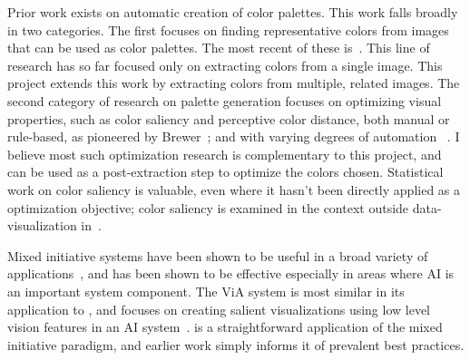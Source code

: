 Prior work exists on automatic creation of color palettes. This work falls broadly in two categories. The first focuses on finding representative  colors from images that can be used as color palettes. The most recent of these is~\cite{morse2007image}. This line of research has so far focused only on extracting colors from a single image. This project extends this work by extracting colors from multiple, related images. The second category of research on palette generation focuses on optimizing visual properties, such as color saliency and perceptive color distance, both manual or rule-based, as pioneered by Brewer~\cite{brewer1999color}; and  with varying degrees of automation ~\cite{healey1996choosing, zeileis2009RGBland}. I believe most such optimization research is complementary to this project, and can be used as a post-extraction step to optimize the colors chosen. Statistical work on color saliency is valuable, even where it hasn't been directly applied as a optimization objective; color saliency is examined in the context outside data-visualization in~\cite{chuang2008probabilistic, benavente2002statistical}. 

Mixed initiative systems have been shown to be useful in a broad variety of applications~\cite{hearst1999mixed}, and has been shown to be effective especially in areas where AI is an important system component. The ViA system is most similar in its application to \system, and focuses on creating salient visualizations using low level vision features in an AI system~\cite{healey2008visual}. \system is a straightforward application of the mixed initiative paradigm, and earlier work simply informs it of prevalent best practices.
